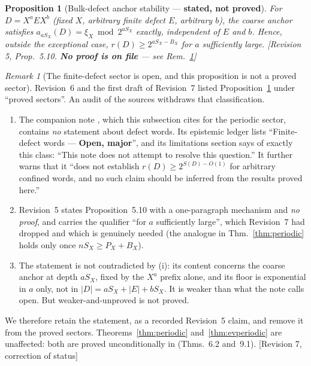 \documentclass[11pt]{article}
\theoremstyle{plain}
\newtheorem{proposition}[theorem]{Proposition}
\theoremstyle{definition}
\theoremstyle{remark}
\newtheorem{remark}[theorem]{Remark}
\newcommand{\status}[1]{\textsf{\footnotesize[#1]}}
\begin{document}
\begin{proposition}[Bulk-defect anchor stability --- \textbf{stated, not proved}]\label{prop:bulkdefect}
For $D=X^aEX^b$ (fixed $X$, arbitrary finite defect $E$, arbitrary $b$), the coarse anchor satisfies
$a_{aS_X}(D)=\xi_X\bmod2^{aS_X}$ exactly, independent of $E$ and $b$. Hence, outside the
exceptional case, $r(D)\ge2^{aS_X-B_X}$ \emph{for $a$ sufficiently large}.
\status{Revision 5, Prop.~5.10. \textbf{No proof is on file} --- see Rem.~\ref{rem:bulkdefectopen}}
\end{proposition}

\begin{remark}[The finite-defect sector is open, and this proposition is not a proved
sector]\label{rem:bulkdefectopen}
Revision~6 and the first draft of Revision~7 listed Proposition~\ref{prop:bulkdefect} under
``proved sectors''. An audit of the sources withdraws that classification.

\begin{enumerate}[label=(\roman*),leftmargin=2em]
\item The companion note \cite{DJperiodic}, which this subsection cites for the periodic sector,
  contains \emph{no} statement about defect words. Its epistemic ledger lists ``Finite-defect
  words --- \textbf{Open, major}'', and its limitations section says of exactly this class: ``This
  note does not attempt to resolve this question.'' It further warns that it ``does not establish
  $r(D)\ge2^{S(D)-O(1)}$ for arbitrary confined words, and no such claim should be inferred from
  the results proved here.''
\item Revision~5 states Proposition~5.10 with a one-paragraph mechanism and \emph{no proof}, and
  carries the qualifier ``for $a$ sufficiently large'', which Revision~7 had dropped and which is
  genuinely needed (the analogue in Thm.~\ref{thm:periodic} holds only once $nS_X\ge P_X+B_X$).
\item The statement is not contradicted by (i): its content concerns the coarse anchor at depth
  $aS_X$, fixed by the $X^a$ prefix alone, and its floor is exponential in $a$ only, not in
  $|D|=aS_X+|E|+bS_X$. It is weaker than what the note calls open. But weaker-and-unproved is not
  proved.
\end{enumerate}

We therefore retain the statement, as a recorded Revision~5 claim, and remove it from the proved
sectors. Theorems~\ref{thm:periodic} and~\ref{thm:evperiodic} are unaffected: both are proved
unconditionally in \cite{DJperiodic} (Thms.~6.2 and~9.1). \status{Revision 7, correction of status}
\end{remark}
\end{document}
